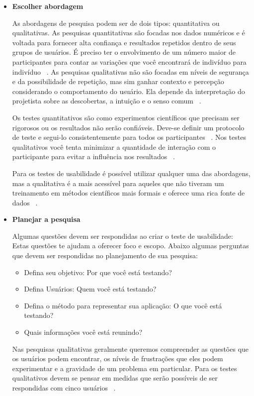 \begin{itemize}

	\item \textbf{Escolher abordagem}

	As abordagens de pesquisa podem ser de dois tipos: quantitativa ou qualitativas. 
	As pesquisas quantitativas são focadas nos dados numéricos e é voltada para fornecer alta confiança e resultados repetidos dentro de seus grupos de usuários. É preciso ter o envolvimento de um número maior de participantes para contar as variações que você encontrará de indivíduo para indivíduo ~\cite{unger2009}.
	As pesquisas qualitativas não são focadas em níveis de segurança e da possibilidade de repetição, mas sim ganhar contexto e percepção considerando o comportamento do usuário. Ela depende da interpretação do projetista sobre as descobertas, a intuição e o senso comum ~\cite{unger2009}.

	Os testes quantitativos são como experimentos científicos que precisam ser rigorosos ou os resultados não serão confiáveis. Deve-se definir um protocolo de teste e segui-lo consistentemente para todos os participantes ~\cite{krug2010}.
	Nos testes qualitativos você tenta minimizar a quantidade de interação com o participante para evitar a influência nos resultados ~\cite{krug2010}.

	Para os testes de usabilidade é possível utilizar qualquer uma das abordagens, mas a qualitativa é a mais acessível para aqueles que não tiveram um treinamento em métodos científicos mais formais e oferece uma rica fonte de dados ~\cite{unger2009}.


	\item \textbf{Planejar a pesquisa}

	Algumas questões devem ser respondidas ao criar o teste de usabilidade: Estas questões te ajudam a oferecer foco e escopo. Abaixo algumas perguntas que devem ser respondidas no planejamento de sua pesquisa:

	\begin{itemize}
		\item Defina seu objetivo: Por que você está testando? 
	\item Defina Usuários: Quem você está testando? 
	\item Defina o método para representar sua aplicação: O que você está testando?
	\item Quais informações você está reunindo? 
	\end{itemize}
	

Nas pesquisas qualitativas geralmente queremos compreender as questões que os usuários podem encontrar, os níveis de frustrações que eles podem experimentar e a gravidade de um problema em particular. Para os testes qualitativos devem se pensar em medidas que serão possíveis de ser respondidas com cinco usuários ~\cite{unger2009}. 


\end{itemize}
